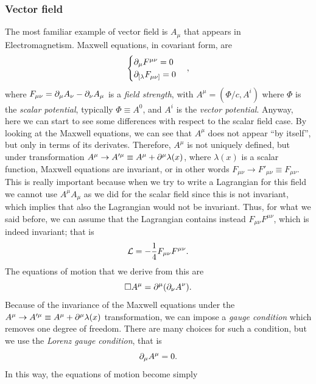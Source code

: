 \subsubsection{Vector field} 
The most familiar example of vector field is $A_\mu$ that appears in Electromagnetism. Maxwell equations, in covariant form, are 
\begin{equation}
    \begin{cases}
        \partial_\mu F^{\mu\nu} = 0 \\
        \partial_{[\lambda}F_{\mu\nu]} = 0
    \end{cases},
\end{equation}
where $F_{\mu\nu} = \partial_\mu A_\nu - \partial_\nu A_\mu$ is a \emph{field strength}, with $A^\mu = (\Phi/c,A^i)$ where $\Phi$ is the \emph{scalar potential}, typically $\Phi \equiv A^0$, and $A^i$ is the \emph{vector potential}. Anyway, here we can start to see some differences with respect to the scalar field case. By looking at the Maxwell equations, we can see that $A^\mu$ does not appear ``by itself'', but only in terms of its derivates. Therefore, $A^\mu$ is not uniquely defined, but under transformation $A^\mu \to A^{\prime\mu} \equiv A^\mu + \partial^\mu\lambda(x)$, where $\lambda(x)$ is a scalar function, Maxwell equations are invariant, or in other words $F_{\mu\nu} \to F'_{\mu\nu} \equiv F_{\mu\nu}$. This is really important because when we try to write a Lagrangian for this field we cannot use $A^\mu A_\mu$ as we did for the scalar field since this is not invariant, which implies that also the Lagrangian would not be invariant. Thus, for what we said before, we can assume that the Lagrangian contains instead $F_{\mu\nu}F^{\mu\nu}$, which is indeed invariant; that is 
\begin{equation}
    \mathcal{L} = -\frac{1}{4}F_{\mu\nu}F^{\mu\nu}.
\end{equation}
The equations of motion that we derive from this are 
\begin{equation}
    \square A^\mu = \partial^\mu(\partial_\nu A^\nu).
\end{equation}
Because of the invariance of the Maxwell equations under the $A^\mu \to A^{\prime\mu} \equiv A^\mu + \partial^\mu\lambda(x)$ transformation, we can impose a \emph{gauge condition} which removes one degree of freedom. There are many choices for such a condition, but we use the \emph{Lorenz gauge condition}, that is 
\begin{equation}
\label{eq: Lorenz gauge condition}
    \partial_\mu A^\mu = 0.
\end{equation}
In this way, the equations of motion become simply
